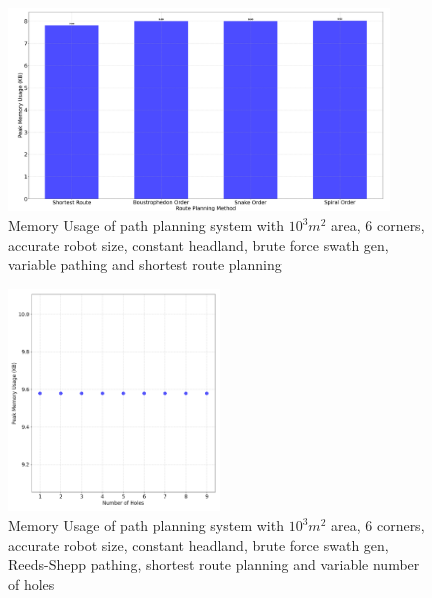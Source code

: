 \documentclass[final]{cmpreport_02}
\begin{document}
\begin{figure}[h!]
	\centering
	\includegraphics[width=0.9\textwidth]{./images/pathingRoutePlanningMem.png}
	\caption{Memory Usage of path planning system with $10^3m^2$ area, 6 corners, accurate robot size, constant headland, brute force swath gen, variable pathing and shortest route planning}
	\label{PE:p:RoutePlanningMem}
\end{figure}


\begin{figure}[h!]
	\centering
	\includegraphics[width=0.5\textwidth]{./images/pathingHolesMem.png}
	\caption{Memory Usage of path planning system with $10^3m^2$ area, 6 corners, accurate robot size, constant headland, brute force swath gen, Reeds-Shepp pathing, shortest route planning and variable number of holes}
	\label{PE:p:HolesMem}
\end{figure}
\end{document}
